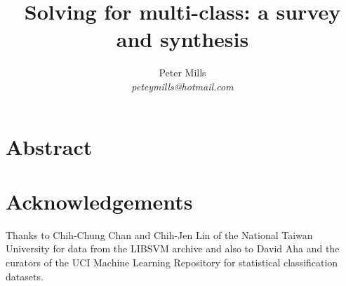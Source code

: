 \documentclass{article}
\begin{document}
\title{Solving for multi-class: a survey and synthesis}

\author{Peter Mills\\\textit{peteymills@hotmail.com}}

\maketitle

\section*{Abstract}



\tableofcontents



\appendix

\section*{Acknowledgements}

Thanks to Chih-Chung Chan and Chih-Jen Lin of the National Taiwan University
for data from the LIBSVM archive and also to David Aha and the curators of
the UCI Machine Learning Repository for statistical classification datasets.


\end{document}
